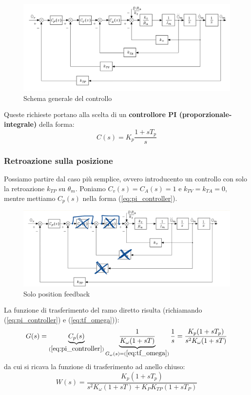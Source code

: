 \begin{figure}[H]
	\centering
	\includegraphics[width=0.9\linewidth]{images/decentralized_joint_space_control_6}
	\caption{Schema generale del controllo}
	\label{fig:decentralizedjointspacecontrol6}
\end{figure}


Queste richieste portano alla scelta di un \textbf{controllore PI (proporzionale-integrale)} della forma:
\begin{equation}\label{eq:pi_controller}
C(s) = K_p \frac{1+sT_p}{s}
\end{equation}






\subsubsection{Retroazione sulla posizione}
Possiamo partire dal caso più semplice, ovvero introducento un controllo con solo la retroazione $k_{TP}$ su $\theta_m$. Poniamo $C_v(s) = C_A(s) = 1$ e $k_{TV} = k_{TA} = 0$, mentre mettiamo $C_p(s)$ nella forma (\ref{eq:pi_controller}).

\begin{figure}[ht!]
	\centering
	\includegraphics[width=0.7\linewidth]{images/position_feedback}
	\caption{Solo position feedback}
	\label{fig:positionfeedback}
\end{figure}

La funzione di trasferimento del ramo diretto risulta (richiamando (\ref{eq:pi_controller}) e (\ref{eq:tf_omega})):
$$
G(s) = 
\underbrace{C_p(s)}_{(\ref{eq:pi_controller})}
\underbrace{ \frac{1}{K_\omega(1 + sT)} }_{G_\omega(s) =(\ref{eq:tf_omega})}
\frac{1}{s}
= \frac{K_p(1+sT_p)}{s^2K_\omega(1+sT)}
$$
da cui si ricava la funzione di trasferimento ad anello chiuso:
$$
W(s) = \frac{K_p(1+sT_p)}{s^2K_\omega(1+sT) + K_P K_{TP} (1+sT_P)}
$$

